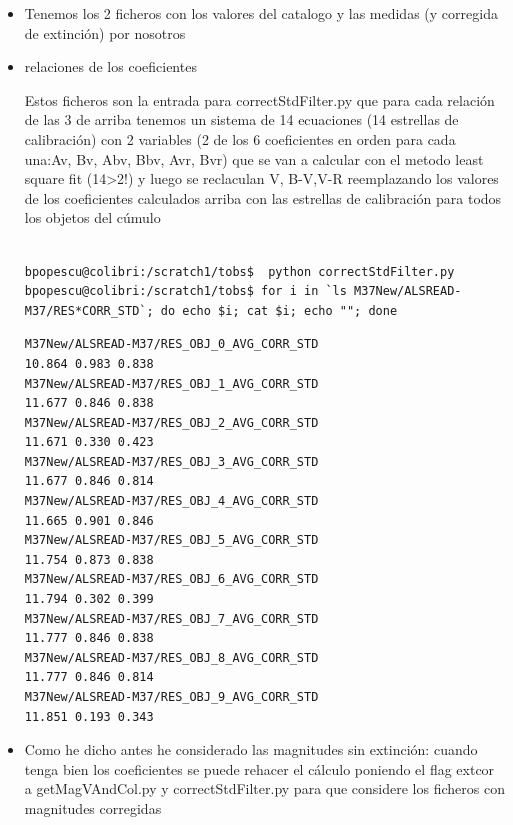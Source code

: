 \documentclass{article}
\begin{document}
\begin{itemize}
\item Tenemos los 2 ficheros con los valores del catalogo y las medidas (y corregida de extinción) por nosotros


\item relaciones de los coeficientes

Estos ficheros son la entrada para correctStdFilter.py
que para cada relación de las 3 de arriba tenemos un sistema de 14 ecuaciones (14 estrellas de calibración) con 2 variables (2 de los 6 coeficientes en orden para cada una:Av, Bv, Abv, Bbv, Avr, Bvr)
que se van a calcular con el metodo least square fit (14>2!) y luego se reclaculan V, B-V,V-R reemplazando los valores de los coeficientes 
calculados arriba con las estrellas de calibración para todos los objetos del cúmulo


{\tiny
\begin{verbatim}

bpopescu@colibri:/scratch1/tobs$  python correctStdFilter.py
bpopescu@colibri:/scratch1/tobs$ for i in `ls M37New/ALSREAD-M37/RES*CORR_STD`; do echo $i; cat $i; echo ""; done
\end{verbatim}
}
{\small
\begin{verbatim}
M37New/ALSREAD-M37/RES_OBJ_0_AVG_CORR_STD
10.864 0.983 0.838 
M37New/ALSREAD-M37/RES_OBJ_1_AVG_CORR_STD
11.677 0.846 0.838 
M37New/ALSREAD-M37/RES_OBJ_2_AVG_CORR_STD
11.671 0.330 0.423 
M37New/ALSREAD-M37/RES_OBJ_3_AVG_CORR_STD
11.677 0.846 0.814 
M37New/ALSREAD-M37/RES_OBJ_4_AVG_CORR_STD
11.665 0.901 0.846 
M37New/ALSREAD-M37/RES_OBJ_5_AVG_CORR_STD
11.754 0.873 0.838 
M37New/ALSREAD-M37/RES_OBJ_6_AVG_CORR_STD
11.794 0.302 0.399 
M37New/ALSREAD-M37/RES_OBJ_7_AVG_CORR_STD
11.777 0.846 0.838 
M37New/ALSREAD-M37/RES_OBJ_8_AVG_CORR_STD
11.777 0.846 0.814 
M37New/ALSREAD-M37/RES_OBJ_9_AVG_CORR_STD
11.851 0.193 0.343 

\end{verbatim}
}

\item Como he dicho antes he considerado las magnitudes sin extinción: cuando tenga bien los coeficientes se puede rehacer el cálculo poniendo el flag extcor a getMagVAndCol.py y correctStdFilter.py para que considere los ficheros con magnitudes corregidas


\end{itemize}
\end{document}
